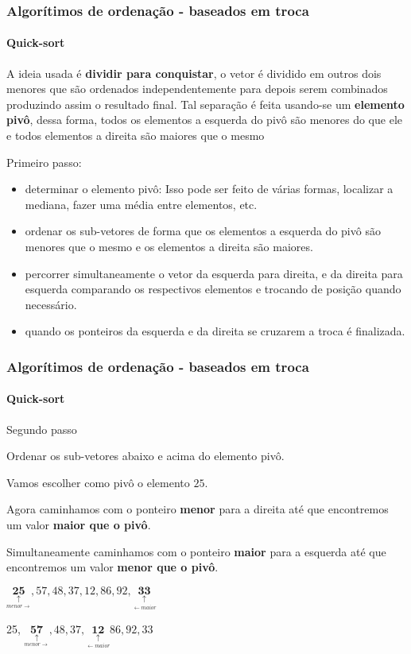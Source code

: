 \begin{frame}
	\frametitle{Algorítimos de ordenação - baseados em troca}
	\framesubtitle{Quick-sort}
	\par A ideia usada é \textbf{dividir para conquistar}, o vetor é dividido em outros dois menores que são ordenados independentemente para depois serem combinados produzindo assim o resultado final. Tal separação é feita usando-se um \textbf{elemento pivô}, dessa forma, todos os elementos a esquerda do pivô são menores do que ele e todos elementos a direita são maiores que o mesmo
	\par Primeiro passo:
	\begin{itemize}
		\item determinar o elemento pivô: Isso pode ser feito de várias formas, localizar a mediana, fazer uma média entre elementos, etc. 
		\item ordenar os sub-vetores de forma que os elementos a esquerda do pivô são menores que o mesmo e os elementos a direita são maiores.
		\item percorrer simultaneamente o vetor da esquerda para direita, e da direita para esquerda comparando os respectivos elementos e trocando de posição quando necessário.
		\item quando os ponteiros da esquerda e da direita se cruzarem a troca é finalizada.		
	\end{itemize}
\end{frame}

\begin{frame}
	\frametitle{Algorítimos de ordenação - baseados em troca}
	\framesubtitle{Quick-sort}
	
	\par Segundo passo
	\par Ordenar os sub-vetores abaixo e acima do elemento pivô. 
	
	\par Vamos escolher como pivô o elemento $25$.
	
	\par Agora caminhamos com o ponteiro \textbf{menor} para a direita até que encontremos um valor \textbf{maior que o pivô}. 
	
	\par Simultaneamente caminhamos com o ponteiro \textbf{maior} para a esquerda até que encontremos um valor \textbf{menor que o pivô}.\newline
	
	\par $\underset{\underset{menor \rightarrow}{\uparrow}}{\mathbf{25}}, 57, 48, 37, 12, 86, 92, \underset{\underset{\leftarrow maior}{\uparrow}}{\mathbf{33}}$ \newline
	
	\par 25, $\underset{\underset{menor \rightarrow}{\uparrow}}{\mathbf{57}}, 48, 37, \underset{\underset{\leftarrow maior}{\uparrow}}{\mathbf{12}} 86, 92, 33 $
\end{frame}


